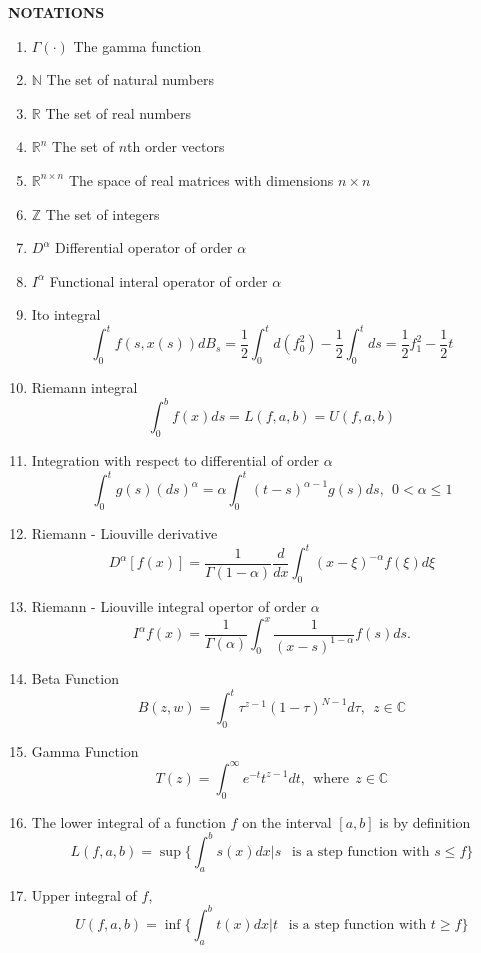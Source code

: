 \documentclass[a4 paper, 12pt]{report}
\theoremstyle{plain}
\begin{document}


\newpage 
\tableofcontents
{}


\newpage
\listoffigures
{}
\newpage
\begin{center}
    \textbf{NOTATIONS}
\end{center}
\begin{enumerate}
\item $\Gamma(\cdot)$ The gamma function
\item $\mathbb{N}$ The set of natural numbers
\item $\mathbb{R}$ The set of real numbers
\item $\mathbb{R}^n$ The set of $n$th order vectors
\item $\mathbb{R}^{n\times n}$ The space of real matrices with dimensions $n\times n$
\item $\mathbb{Z}$ The set of integers
\item $D^\alpha$ Differential operator of order $\alpha$
\item $I^\alpha$ Functional interal operator of order $\alpha$
\item Ito integral
$$
\int_0^t f(s,x(s))dB_s = \frac{1}{2}\int_0^td(f_0^2)-\frac{1}{2}\int_0^tds = \frac{1}{2}f_1^2-\frac{1}{2}t 
$$
\item Riemann  integral
$$
\int_0^b f(x)ds = L(f,a,b) = U(f,a,b)
$$
\item Integration with respect to differential of order $\alpha$
$$
\int_0^t g(s)(ds)^\alpha = \alpha\int_0^t(t-s)^{\alpha - 1}g(s)ds,~~0 < \alpha\leq 1
$$
\item Riemann - Liouville derivative
$$
D^\alpha[f(x)] = \frac{1}{\Gamma(1-\alpha)}\frac{d}{dx}\int_0^t(x-\xi)^{-\alpha}f(\xi)d\xi
$$
\item Riemann - Liouville integral opertor of order $\alpha$
$$
I^\alpha f(x) = \frac{1}{\Gamma(\alpha)}\int_0^x\frac{1}{(x-s)^{1-\alpha}}f(s)ds.
$$

\item Beta Function
$$
B(z,w) = \int_0^t\tau^{z-1}(1-\tau)^{N-1} d\tau,~~z\in\mathbb{C}
$$
\item Gamma Function
$$
T(z)  = \int_0^\infty  e^{-t}t^{z-1}dt,~~\mbox{where}~~  z\in\mathbb{C}
$$
\item The lower integral of a function $f$ on the interval $[a,b]$ is by definition
$$
L(f,a,b) = \sup\bigg\{\int_a^bs(x)dx|s~~\mbox{  is a step function with  } s\leq f\bigg\}
$$
\item Upper integral of $f$,
$$
U(f,a,b) = \inf\bigg\{\int_a^bt(x)dx|t~~\mbox{  is a step function with  } t\geq f\bigg\}
$$
\end{enumerate}
\end{document}

